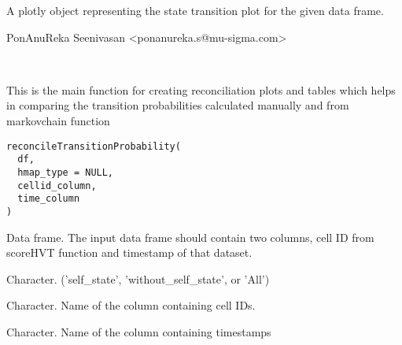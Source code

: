 \documentclass[letterpaper]{book}
\begin{document}
%
\begin{Value}
A plotly object representing the state transition plot for the given data frame.
\end{Value}
%
\begin{Author}
PonAnuReka Seenivasan <ponanureka.s@mu-sigma.com>
\end{Author}
%
\begin{SeeAlso}
 \\{} 
\end{SeeAlso}
%
\begin{Examples}
\end{Examples}
%
\begin{Description}
This is the main function for creating reconciliation plots and tables which 
helps in comparing the transition probabilities calculated manually and from markovchain function
\end{Description}
%
\begin{Usage}
\begin{verbatim}
reconcileTransitionProbability(
  df,
  hmap_type = NULL,
  cellid_column,
  time_column
)
\end{verbatim}
\end{Usage}
%
\begin{Arguments}
\begin{ldescription}
\item[\code{df}] Data frame. The input data frame should contain two columns, cell ID from scoreHVT function and timestamp of that dataset.

\item[\code{hmap\_type}] Character. ('self\_state', 'without\_self\_state', or 'All')

\item[\code{cellid\_column}] Character. Name of the column containing cell IDs.

\item[\code{time\_column}] Character. Name of the column containing timestamps
\end{ldescription}
\end{Arguments}
\end{document}
